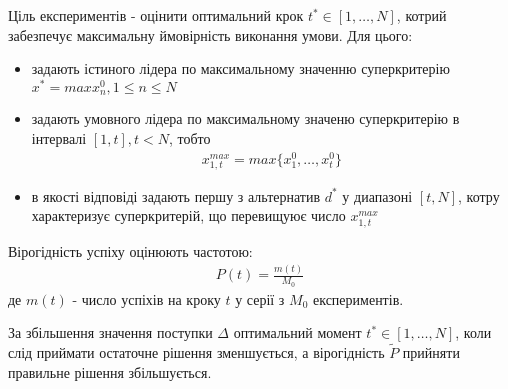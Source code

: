 Ціль експериментів - оцінити оптимальний крок $t^* \in [1, \dots, N]$,
котрий забезпечує максимальну ймовірність виконання умови.
Для цього:
\begin{itemize}
    \item задають істиного лідера по максимальному значенню
          суперкритерію $x^* = max x_n^0, 1 \leq n \leq N$
    \item задають умовного лідера по максимальному значеню
          суперкритерію в інтервалі $[1, t], t < N$, тобто
          \begin{align}
              x_{1, t}^{max} = max \{x_1^0, \dots, x_t^0\}
          \end{align}
    \item в якості відповіді задають першу з альтернатив $d^*$
          у диапазоні $[t, N]$, котру характеризує суперкритерій,
          що перевищуює число $x_{1, t}^{max}$
\end{itemize}
Вірогідність успіху оцінюють частотою:
\begin{align}
    P(t) = \frac{m(t)}{M_0}
\end{align}
де $m(t)$ - число успіхів на кроку $t$ у серії з $M_0$ експериментів.

За збільшення значення поступки $\Delta$
оптимальний момент $t^* \in [1, \dots, N]$, коли слід приймати остаточне рішення
зменшується, а вірогідність $\widetilde{P}$ прийняти правильне рішення збільшується.
